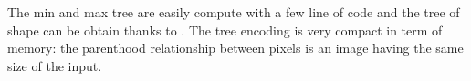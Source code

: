 The min and max tree are easily compute with a few line of code \cite{berger.07.icip} and the tree of shape can be obtain thanks to \cite{geraud.13.ismm}. The tree encoding is very compact in term of memory: the parenthood relationship between pixels is an image having the same size of the input. 

	